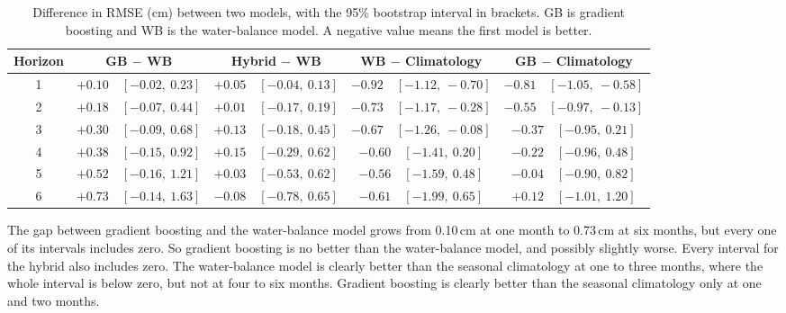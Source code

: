 \documentclass{article}
\begin{document}
\begin{table}[htbp]
\centering
\caption{Difference in RMSE (cm) between two models, with the 95\% bootstrap interval in
brackets. GB is gradient boosting and WB is the water-balance model. A negative value means the
first model is better.}
\label{tab:boot}
\small
\begin{tabular}{||c|c|c|c|c||}
\hline\hline
Horizon & GB $-$ WB & Hybrid $-$ WB & WB $-$ Climatology & GB $-$ Climatology \\
\hline\hline
1 & $+0.10$\ \ $[-0.02,\ 0.23]$ & $+0.05$\ \ $[-0.04,\ 0.13]$ & $-0.92$\ \ $[-1.12,\ -0.70]$
& $-0.81$\ \ $[-1.05,\ -0.58]$ \\
2 & $+0.18$\ \ $[-0.07,\ 0.44]$ & $+0.01$\ \ $[-0.17,\ 0.19]$ & $-0.73$\ \ $[-1.17,\ -0.28]$
& $-0.55$\ \ $[-0.97,\ -0.13]$ \\
3 & $+0.30$\ \ $[-0.09,\ 0.68]$ & $+0.13$\ \ $[-0.18,\ 0.45]$ & $-0.67$\ \ $[-1.26,\ -0.08]$
& $-0.37$\ \ $[-0.95,\ 0.21]$ \\
4 & $+0.38$\ \ $[-0.15,\ 0.92]$ & $+0.15$\ \ $[-0.29,\ 0.62]$ & $-0.60$\ \ $[-1.41,\ 0.20]$
& $-0.22$\ \ $[-0.96,\ 0.48]$ \\
5 & $+0.52$\ \ $[-0.16,\ 1.21]$ & $+0.03$\ \ $[-0.53,\ 0.62]$ & $-0.56$\ \ $[-1.59,\ 0.48]$
& $-0.04$\ \ $[-0.90,\ 0.82]$ \\
6 & $+0.73$\ \ $[-0.14,\ 1.63]$ & $-0.08$\ \ $[-0.78,\ 0.65]$ & $-0.61$\ \ $[-1.99,\ 0.65]$
& $+0.12$\ \ $[-1.01,\ 1.20]$ \\
\hline\hline
\end{tabular}
\end{table}

The gap between gradient boosting and the water-balance model grows from 0.10\,cm at one month to
0.73\,cm at six months, but every one of its intervals includes zero. So gradient boosting is no
better than the water-balance model, and possibly slightly worse. Every interval for the hybrid
also includes zero. The water-balance model is clearly better than the seasonal climatology at
one to three months, where the whole interval is below zero, but not at four to six months.
Gradient boosting is clearly better than the seasonal climatology only at one and two months.
\end{document}
